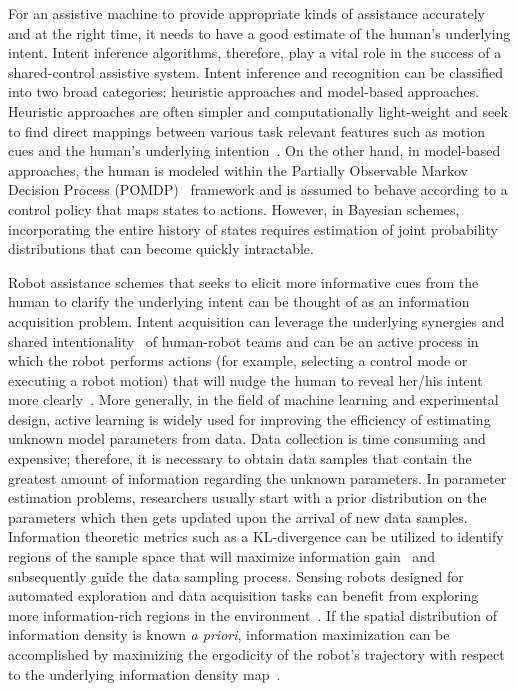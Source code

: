 \documentclass[conference]{IEEEtran}
\begin{document}
For an assistive machine to provide appropriate kinds of assistance accurately and at the right time, it needs to have a good estimate of the human's underlying intent. Intent inference algorithms, therefore, play a vital role in the success of a shared-control assistive system. Intent inference and recognition can be classified into two broad categories: heuristic approaches and model-based approaches. Heuristic approaches are often simpler and computationally light-weight and seek to find direct mappings between various task relevant features such as motion cues and the human's underlying intention~\citep{baker2007goal, baker2009action}. On the other hand, in model-based approaches, the human is modeled within the Partially Observable Markov Decision Process (POMDP)~\citep{taha2011pomdp, dragan2013policy} framework and is assumed to behave according to a control policy that maps states to actions. However, in Bayesian schemes, incorporating the entire history of states requires estimation of joint probability distributions that can become quickly intractable. 

Robot assistance schemes that seeks to elicit more informative cues from the human to clarify the underlying intent can be thought of as an information acquisition problem. Intent acquisition can leverage the underlying synergies and shared intentionality~\citep{tomasello2007shared} of human-robot teams and can be an active process in which the robot performs actions (for example, selecting a control mode or executing a robot motion) that will nudge the human to reveal her/his intent more clearly~\cite{sadigh2016information, sadigh2016planning}. More generally, in the field of machine learning and experimental design, active learning is widely used for improving the efficiency of estimating unknown model parameters from data. Data collection is time consuming and expensive; therefore, it is necessary to obtain data samples that contain the greatest amount of information regarding the unknown parameters. In parameter estimation problems, researchers usually start with a prior distribution on the parameters which then gets updated upon the arrival of new data samples. Information theoretic metrics such as a KL-divergence can be utilized to identify regions of the sample space that will maximize information gain~\citep{tong2001active} and subsequently guide the data sampling process. 
Sensing robots designed for automated exploration and data acquisition tasks can benefit from exploring more information-rich regions in the environment~\citep{atanasov2014information}. If the spatial distribution of information density is known \textit{a priori}, information maximization can be accomplished by maximizing the ergodicity of the robot's trajectory with respect to the underlying information density map~\citep{miller2016ergodic, miller2013trajectory}. 
\end{document}

